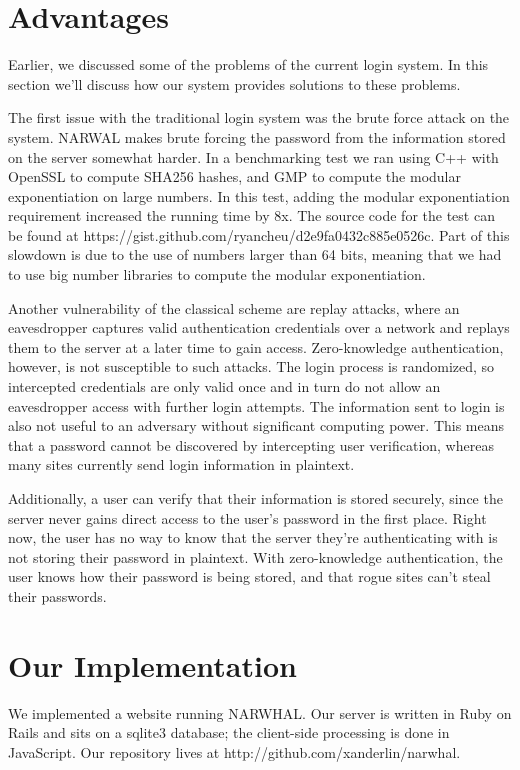 \documentclass[11pt]{article}
\begin{document}
\section{Advantages}

Earlier, we discussed some of the problems of the current login system.  In this section we’ll discuss how our system provides solutions to these problems.

The first issue with the traditional login system was the brute force attack on the system.  NARWAL makes brute forcing the password from the information stored on the server somewhat harder.  In a benchmarking test we ran using C++ with OpenSSL to compute SHA256 hashes, and GMP to compute the modular exponentiation on large numbers.  In this test, adding the modular exponentiation requirement increased the running time by 8x. The source code for the test can be found at https://gist.github.com/ryancheu/d2e9fa0432c885e0526c.  Part of this slowdown is due to the use of numbers larger than 64 bits, meaning that we had to use big number libraries to compute the modular exponentiation.

Another vulnerability of the classical scheme are replay attacks, where an eavesdropper captures valid authentication credentials over a network and replays them to the server at a later time to gain access. Zero-knowledge authentication, however, is not susceptible to such attacks.  The login process is randomized, so intercepted credentials are only valid once and in turn do not allow an eavesdropper access with further login attempts.  The information sent to login is also not useful to an adversary without significant computing power.  This means that a password cannot be discovered by intercepting user verification, whereas many sites currently send login information in plaintext.

Additionally, a user can verify that their information is stored securely, since the server never gains direct access to the user’s password in the first place.  Right now, the user has no way to know that the server they’re authenticating with is not storing their password in plaintext.  With zero-knowledge authentication, the user knows how their password is being stored, and that rogue sites can’t steal their passwords.

\section{Our Implementation}

We implemented a website running NARWHAL. Our server is written in Ruby on Rails and sits on a sqlite3 database; the client-side processing is done in JavaScript. Our repository lives at http://github.com/xanderlin/narwhal.
\end{document}
